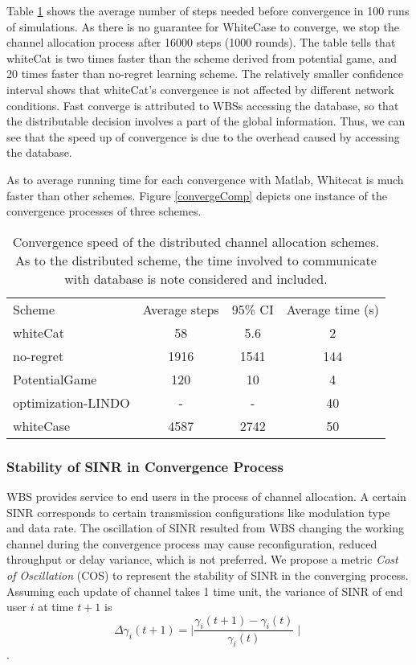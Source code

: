 Table \ref{convergencespeed} shows the average number of steps needed before convergence in 100 runs of simulations.
As there is no guarantee for WhiteCase to converge, we stop the channel allocation process after 16000 steps (1000 rounds).
The table tells that whiteCat is two times faster than the scheme derived from potential game, and 20 times faster than no-regret learning scheme.
The relatively smaller confidence interval shows that whiteCat's convergence is not affected by different network conditions.
Fast converge is attributed to WBSs accessing the database, so that the distributable decision involves a part of the global information.
Thus, we can see that the speed up of convergence is due to the overhead caused by accessing the database.

As to average running time for each convergence with Matlab, Whitecat is much faster than other schemes.
Figure \ref{convergeComp} depicts one instance of the convergence processes of three schemes.

\begin{table}[!h]
\centering
\begin{tabular}{|l|c|c|c|}
  \hline
  Scheme			 						& Average steps 	 		& 95\% CI			&Average time (s)\\
    \hhline{|=|=|=|=|}
  whiteCat									& 58						& 5.6						&2\\\hline
  no-regret									& 1916						& 1541						&144\\\hline
  PotentialGame~\cite{pimrc_2012}			& 120						& 10						&4\\\hline
  optimization-LINDO						& -                         & -                         &40\\\hline
  whiteCase 								& 4587 						& 2742						&50\\  
  \hline
\end{tabular}
\caption{Convergence speed of the distributed channel allocation schemes. As to the distributed scheme, the time involved to communicate with database is note considered and included.}
\label{convergencespeed}
\end{table}


\subsubsection*{Stability of SINR in Convergence Process}
WBS provides service to end users in the process of channel allocation. 
A certain SINR corresponds to certain transmission configurations like modulation type and data rate. 
The oscillation of SINR resulted from WBS changing the working channel during the convergence process may cause reconfiguration, reduced throughput or delay variance, which is not preferred.
We propose a metric \textit{Cost of Oscillation} (\gls{COS}) to represent the stability of SINR in the converging process.
Assuming each update of channel takes 1 time unit, the variance of SINR of end user $i$ at time $t+1$ is \[\varDelta  \gamma_i(t+1)=\mid\frac{\gamma_i(t+1)-\gamma_i(t)}{\gamma_i(t)} \mid\]. 

